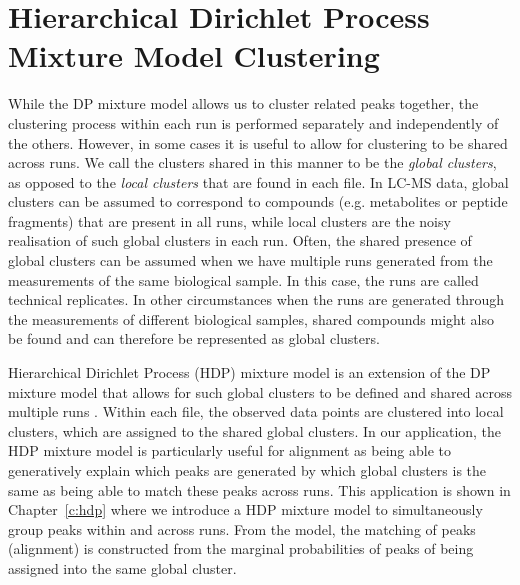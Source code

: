 \section{Hierarchical Dirichlet Process Mixture Model Clustering\label{background-hdp-clustering}}

While the DP mixture model allows us to cluster related peaks together, the clustering process within each run is performed separately and independently of the others. However, in some cases it is useful to allow for clustering to be shared across runs. We call the clusters shared in this manner to be the \emph{global clusters}, as opposed to the \emph{local clusters} that are found in each file. In LC-MS data, global clusters can be assumed to correspond to compounds (e.g. metabolites or peptide fragments) that are present in all runs, while local clusters are the noisy realisation of such global clusters in each run. Often, the shared presence of global clusters can be assumed when we have multiple runs generated from the measurements of the same biological sample. In this case, the runs are called technical replicates. In other circumstances when the runs are generated through the measurements of different biological samples, shared compounds might also be found and can therefore be represented as global clusters.

Hierarchical Dirichlet Process (HDP) mixture model is an extension of the DP mixture model that allows for such global clusters to be defined and shared across multiple runs \cite{teh2012hierarchical}. Within each file, the observed data points are clustered into local clusters, which are assigned to the shared global clusters. In our application, the HDP mixture model is particularly useful for alignment as being able to generatively explain which peaks are generated by which global clusters is the same as being able to match these peaks across runs. This application is shown in Chapter~\ref{c:hdp} where we introduce a HDP mixture model to simultaneously group peaks within and across runs. From the model, the matching of peaks (alignment) is constructed from the marginal probabilities of peaks of being assigned into the same global cluster. 

